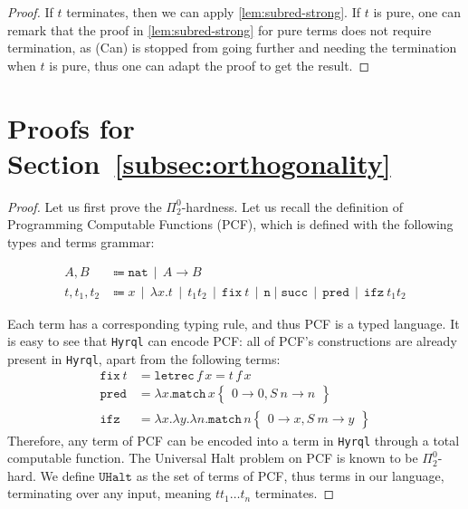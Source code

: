 \documentclass[10pt,a4paper]{article}
\newcommand{\nat}{\mathtt{nat}}
\newcommand{\textmatch}{\ensuremath{\mathtt{match}}}
\newcommand{\textletrec}{\ensuremath{\mathtt{letrec}}}
\newcommand{\match}[2]{
  \textmatch\,#1\left\{\! \begin{aligned} #2 \end{aligned}\right\}
}
\newcommand{\lbd}[2]{\lambda #1 .#2}
\newcommand{\letrec}[3]{\textletrec\,#1\,#2=#3}
\newcommand{\pitwo}{\Pi_2^0}
\newcommand{\uhalt}{\mathtt{UHalt}}
\newcommand{\gmid}{\,\mid\,}
\newcommand{\hyrql}{{{\tt{Hyrql}}}}
\begin{document}
\subred*

\begin{proof}
  If $t$ terminates, then we can apply \autoref{lem:subred-strong}.
  If $t$ is pure, one can remark that the proof in \autoref{lem:subred-strong}
  for pure terms does not require termination, as (Can) is stopped from
  going further and needing the termination when $t$ is pure, thus one
  can adapt the proof to get the result.
\end{proof}

\section{Proofs for Section~\ref{subsec:orthogonality}}

\orthoundecide*

\begin{proof}
  Let us first prove the $\pitwo$-hardness.
  Let us recall the definition of Programming Computable
  Functions (PCF), which is defined with the following types and terms grammar:

  \[
    \begin{aligned}
      A, B &\Coloneqq \nat \gmid A \to B \\
      t, t_1, t_2 &\Coloneqq x \gmid \lbd x t \gmid t_1 t_2 \gmid
      \mathtt{fix}~t \gmid \mathtt n \mid \mathtt{succ} \gmid \mathtt{pred}
      \gmid \mathtt{ifz}~t_1 t_2
    \end{aligned}
  \]

  Each term has a corresponding typing rule, and thus PCF is a typed language.
  It is easy to see that \hyrql{} can encode PCF: all of PCF's constructions are
  already present in \hyrql{}, apart from the following terms:
  \[
    \begin{aligned}
      \mathtt{fix}~t &= \letrec f x t\,f\,x \\
      \mathtt{pred} &= \lbd x \match x {0 \to 0, S~n \to n} \\
      \mathtt{ifz} &= \lbd x \lbd y \lbd n \match n {0 \to x, S~m \to y}
    \end{aligned}
  \]
  Therefore, any term of PCF can be encoded into a term in \hyrql{}
  through a total computable function.
  The Universal Halt problem on PCF is known to be $\pitwo$-hard.
  We define $\uhalt$ as the set of terms of PCF, thus terms
  in our language, terminating over any input,
  meaning $t t_1 \dots t_n$ terminates.


\end{proof}
\end{document}
